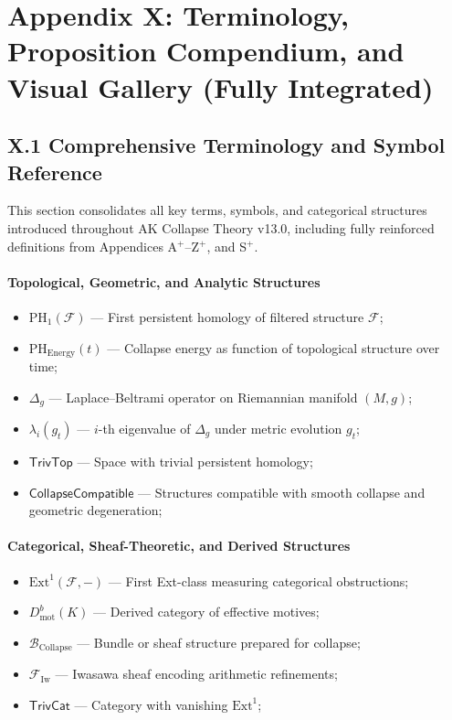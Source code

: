 \documentclass[11pt]{article}
\begin{document}

\section*{Appendix X: Terminology, Proposition Compendium, and Visual Gallery (Fully Integrated)}

\subsection*{X.1 Comprehensive Terminology and Symbol Reference}

This section consolidates all key terms, symbols, and categorical structures introduced throughout AK Collapse Theory v13.0, including fully reinforced definitions from Appendices A$^{+}$–Z$^{+}$, and S$^{+}$.

\paragraph{Topological, Geometric, and Analytic Structures}
\begin{itemize}
    \item $\mathrm{PH}_1(\mathcal{F})$ — First persistent homology of filtered structure $\mathcal{F}$;
    \item $\mathrm{PH}_{\mathrm{Energy}}(t)$ — Collapse energy as function of topological structure over time;
    \item $\Delta_g$ — Laplace--Beltrami operator on Riemannian manifold $(M, g)$;
    \item $\lambda_i(g_t)$ — $i$-th eigenvalue of $\Delta_g$ under metric evolution $g_t$;
    \item $\mathsf{TrivTop}$ — Space with trivial persistent homology;
    \item $\mathsf{CollapseCompatible}$ — Structures compatible with smooth collapse and geometric degeneration;
\end{itemize}

\paragraph{Categorical, Sheaf-Theoretic, and Derived Structures}
\begin{itemize}
    \item $\mathrm{Ext}^1(\mathcal{F}, -)$ — First Ext-class measuring categorical obstructions;
    \item $D^b_{\mathrm{mot}}(K)$ — Derived category of effective motives;
    \item $\mathcal{B}_{\mathrm{Collapse}}$ — Bundle or sheaf structure prepared for collapse;
    \item $\mathcal{F}_{\mathrm{Iw}}$ — Iwasawa sheaf encoding arithmetic refinements;
    \item $\mathsf{TrivCat}$ — Category with vanishing $\mathrm{Ext}^1$;
\end{itemize}
\end{document}

